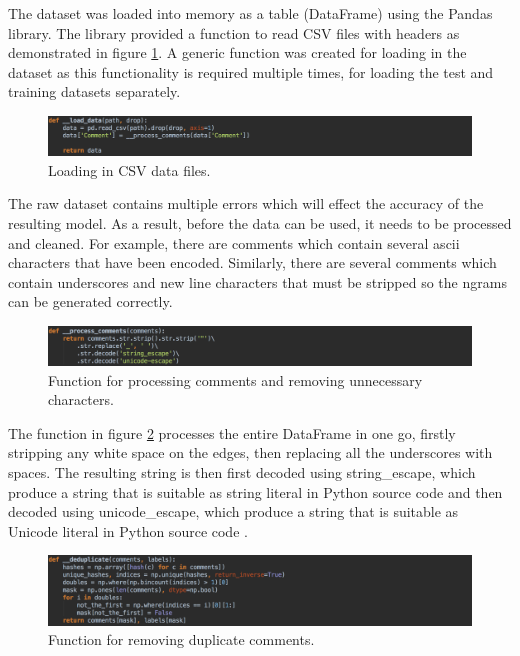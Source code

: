  The dataset was loaded into memory as a table (DataFrame) using the Pandas library. The library provided a function to read CSV files with headers as demonstrated in figure \ref{fig:AbuseDetection_LoadData}. A generic function was created for loading in the dataset as this functionality is required multiple times, for loading the test and training datasets separately.

\begin{figure}[H]
	\centering
	\includegraphics[width=\textwidth]{Images/Implementation/DataProcessing/AbuseDetection/LoadData}
	\caption{Loading in CSV data files.}
	\label{fig:AbuseDetection_LoadData}
\end{figure}

The raw dataset contains multiple errors which will effect the accuracy of the resulting model. As a result, before the data can be used, it needs to be processed and cleaned. For example, there are comments which contain several ascii characters that have been encoded. Similarly, there are several comments which contain underscores and new line characters that must be stripped so the ngrams can be generated correctly.

\begin{figure}[H]
	\centering
	\includegraphics[width=\textwidth]{Images/Implementation/DataProcessing/AbuseDetection/ProcessComments}
	\caption{Function for processing comments and removing unnecessary characters.}
	\label{fig:AbuseDetection-ProcessComments}
\end{figure}

The function in figure \ref{fig:AbuseDetection-ProcessComments} processes the entire DataFrame in one go, firstly stripping any white space on the edges, then replacing all the underscores with spaces. The resulting string is then first decoded using string\_escape, which produce a string that is suitable as string literal in Python source code and then decoded using unicode\_escape, which produce a string that is suitable as Unicode literal in Python source code \cite{Python:Codes}.

\begin{figure}[H]
	\centering
	\includegraphics[width=\textwidth]{Images/Implementation/DataProcessing/AbuseDetection/Deduplicate}
	\caption{Function for removing duplicate comments.}
	\label{fig:AbuseDetection-Deduplicate}
\end{figure}

